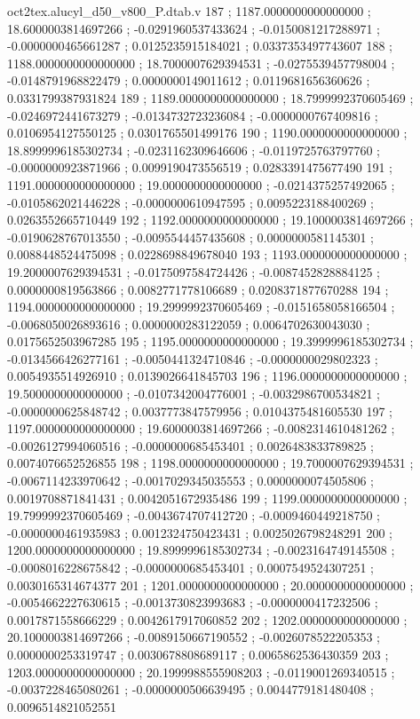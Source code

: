 \begin{filecontents}[overwrite]{oct2tex.alucyl_d50_v800_P.dtab.v}
187 ; 1187.0000000000000000 ; 18.6000003814697266 ; -0.0291960537433624 ; -0.0150081217288971 ; -0.0000000465661287 ; 0.0125235915184021 ; 0.0337353497743607
188 ; 1188.0000000000000000 ; 18.7000007629394531 ; -0.0275539457798004 ; -0.0148791968822479 ; 0.0000000149011612 ; 0.0119681656360626 ; 0.0331799387931824
189 ; 1189.0000000000000000 ; 18.7999992370605469 ; -0.0246972441673279 ; -0.0134732723236084 ; -0.0000000767409816 ; 0.0106954127550125 ; 0.0301765501499176
190 ; 1190.0000000000000000 ; 18.8999996185302734 ; -0.0231162309646606 ; -0.0119725763797760 ; -0.0000000923871966 ; 0.0099190473556519 ; 0.0283391475677490
191 ; 1191.0000000000000000 ; 19.0000000000000000 ; -0.0214375257492065 ; -0.0105862021446228 ; -0.0000000610947595 ; 0.0095223188400269 ; 0.0263552665710449
192 ; 1192.0000000000000000 ; 19.1000003814697266 ; -0.0190628767013550 ; -0.0095544457435608 ; 0.0000000581145301 ; 0.0088448524475098 ; 0.0228698849678040
193 ; 1193.0000000000000000 ; 19.2000007629394531 ; -0.0175097584724426 ; -0.0087452828884125 ; 0.0000000819563866 ; 0.0082771778106689 ; 0.0208371877670288
194 ; 1194.0000000000000000 ; 19.2999992370605469 ; -0.0151658058166504 ; -0.0068050026893616 ; 0.0000000283122059 ; 0.0064702630043030 ; 0.0175652503967285
195 ; 1195.0000000000000000 ; 19.3999996185302734 ; -0.0134566426277161 ; -0.0050441324710846 ; -0.0000000029802323 ; 0.0054935514926910 ; 0.0139026641845703
196 ; 1196.0000000000000000 ; 19.5000000000000000 ; -0.0107342004776001 ; -0.0032986700534821 ; -0.0000000625848742 ; 0.0037773847579956 ; 0.0104375481605530
197 ; 1197.0000000000000000 ; 19.6000003814697266 ; -0.0082314610481262 ; -0.0026127994060516 ; -0.0000000685453401 ; 0.0026483833789825 ; 0.0074076652526855
198 ; 1198.0000000000000000 ; 19.7000007629394531 ; -0.0067114233970642 ; -0.0017029345035553 ; 0.0000000074505806 ; 0.0019708871841431 ; 0.0042051672935486
199 ; 1199.0000000000000000 ; 19.7999992370605469 ; -0.0043674707412720 ; -0.0009460449218750 ; -0.0000000461935983 ; 0.0012324750423431 ; 0.0025026798248291
200 ; 1200.0000000000000000 ; 19.8999996185302734 ; -0.0023164749145508 ; -0.0008016228675842 ; -0.0000000685453401 ; 0.0007549524307251 ; 0.0030165314674377
201 ; 1201.0000000000000000 ; 20.0000000000000000 ; -0.0054662227630615 ; -0.0013730823993683 ; -0.0000000417232506 ; 0.0017871558666229 ; 0.0042617917060852
202 ; 1202.0000000000000000 ; 20.1000003814697266 ; -0.0089150667190552 ; -0.0026078522205353 ; 0.0000000253319747 ; 0.0030678808689117 ; 0.0065862536430359
203 ; 1203.0000000000000000 ; 20.1999988555908203 ; -0.0119001269340515 ; -0.0037228465080261 ; -0.0000000506639495 ; 0.0044779181480408 ; 0.0096514821052551

\end{filecontents}
